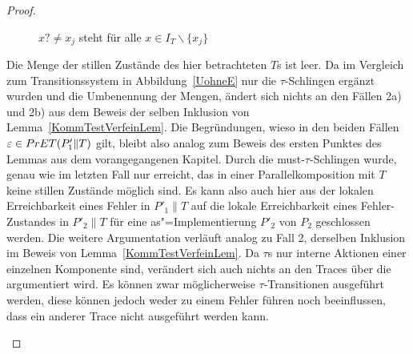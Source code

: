 \begin{proof}
\begin{itemize}
\begin{figure} [h!tbp]
\begin{center}
        \caption{$x?\neq x_j$ steht für alle $x\in I_T\backslash\{x_j\}$}
      \label{TohneEmitTau}
      \end{center}
      \end{figure}
      Die Menge der stillen Zustände des hier betrachteten $T$s ist leer. Da im
      Vergleich zum Transitionssystem in Abbildung~\ref{UohneE} nur die
      $\tau$-Schlingen ergänzt wurden und die Umbenennung der Mengen, ändert
      sich nichts an den Fällen 2a) und 2b) aus dem Beweis der selben Inklusion
      von Lemma~\ref{KommTestVerfeinLem}. Die Begründungen, wieso in den beiden
      Fällen $\varepsilon\in PrET (P'_1\|T)$ gilt, bleibt also analog zum
      Beweis des ersten Punktes des Lemmas aus dem vorangegangenen Kapitel.
      Durch die must-$\tau$-Schlingen wurde, genau wie im letzten Fall nur
      erreicht, das in einer Parallelkomposition mit $T$ keine stillen Zustände
      möglich sind. Es kann also auch hier aus der lokalen Erreichbarkeit eines
      Fehler in $P'_1\|T$ auf die lokale Erreichbarkeit eines Fehler-Zustandes
      in $P'_2\|T$ für eine as"=Implementierung $P'_2$ von $P_2$ geschlossen
      werden. Die weitere Argumentation verläuft analog zu Fall 2, derselben
      Inklusion im Beweis von Lemma~\ref{KommTestVerfeinLem}. Da $\tau$s nur
      interne Aktionen einer einzelnen Komponente sind, verändert sich auch
      nichts an den Traces über die argumentiert wird. Es können zwar
      möglicherweise $\tau$-Transitionen ausgeführt werden, diese können jedoch
      weder zu einem Fehler führen noch beeinflussen, dass ein anderer Trace
      nicht ausgeführt werden kann.
  \end{itemize}


\end{proof}
